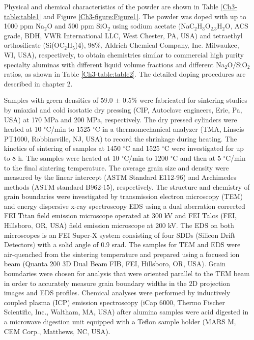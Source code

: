 Physical and chemical characteristics of the powder are shown in Table \ref{Ch3-table:table1} and Figure \ref{Ch3-figure:Figure1}. The powder was doped with up to 1000 ppm Na$_{2}$O and 500 ppm SiO$_{2}$ using sodium acetate (NaC$_{2}$H$_{3}$O$_{2.3}$H$_{2}$O, ACS grade, BDH, VWR International LLC, West Chester, PA, USA) and tetraethyl orthosilicate (Si(OC$_{2}$H$_{5}$)4), 98\%, Aldrich Chemical Company, Inc. Milwaukee, WI, USA), respectively, to obtain chemistries similar to commercial high purity specialty aluminas with different liquid volume fractions and different Na$_{2}$O/SiO$_{2}$ ratios, as shown in Table \ref{Ch3-table:table2}. The detailed doping procedures are described in chapter 2. 

Samples with green densities of 59.0 $\pm$ 0.5\% were fabricated for sintering studies by uniaxial and cold isostatic dry pressing (CIP, Autoclave engineers, Erie, Pa, USA) at 170 MPa and 200 MPa, respectively. The dry pressed cylinders were heated at 10 $^{\circ}$C/min to 1525 $^{\circ}$C in a thermomechanical analyzer (TMA, Linseis PT1600, Robbinsville, NJ, USA) to record the shrinkage during heating. The kinetics of sintering of samples at 1450 $^{\circ}$C and 1525 $^{\circ}$C were investigated for up to 8 h. The samples were heated at 10 $^{\circ}$C/min to 1200 $^{\circ}$C and then at 5 $^{\circ}$C/min to the final sintering temperature. The average grain size and density were measured by the linear intercept (ASTM Standard E112-96) \cite{Standard2013} and Archimedes methods (ASTM standard B962-15), \cite{Standard2015} respectively. The structure and chemistry of grain boundaries were investigated by transmission electron microscopy (TEM) and energy dispersive x-ray spectroscopy EDS using a dual aberration corrected FEI Titan \cite{Bae1993} field emission microscope operated at 300 kV and FEI Talos (FEI, Hillsboro, OR, USA) field emission microscope at 200 kV. The EDS on both microscopes is an FEI Super-X system consisting of four SDDs (Silicon Drift Detectors) with a solid angle of 0.9 srad.  The samples for TEM and EDS were air-quenched from the sintering temperature and prepared using a focused ion beam (Quanta 200 3D Dual Beam FIB, FEI, Hillsboro, OR, USA). Grain boundaries were chosen for analysis that were oriented parallel to the TEM beam in order to accurately measure grain boundary widths in the 2D projection images and EDS profiles. Chemical analyses were performed by inductively coupled plasma (ICP) emission spectroscopy (iCap 6000, Thermo Fischer Scientific, Inc., Waltham, MA, USA) after alumina samples were acid digested in a microwave digestion unit equipped with a Teflon sample holder (MARS M, CEM Corp., Matthews, NC, USA).

